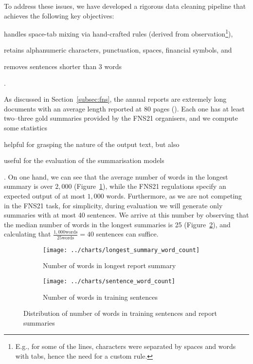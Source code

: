 To address these issues, we have developed a rigorous data cleaning pipeline that achieves the following key objectives:
\begin{enumerate*}
    \item handles space-tab mixing via hand-crafted rules (derived from observation\footnote{
      E.g., for some of the lines, characters were separated by spaces and words with tabs, hence the need for a custom rule.
    }),
    \item retains alphanumeric characters, punctuation, spaces, financial symbols, and
    \item removes sentences shorter than 3 words
\end{enumerate*}.

As discussed in Section~\ref{subsec:fns}, the annual reports are extremely long documents with an average length reported at 80 pages (\cite{litvak-vanetik-2021-summarization}).
Each one has at least two--three gold summaries provided by the FNS21 organisers, and we compute some statistics
\begin{enumerate*}
    \item helpful for grasping the nature of the output text, but also
    \item useful for the evaluation of the summarisation models
\end{enumerate*}.
On one hand, we can see that the average number of words in the longest summary is over $2,000$ (Figure~\ref{fig:longest_summary_word_count}), while the FNS21 regulations specify an expected output of at most $1,000$ words.
Furthermore, as we are not competing in the FNS21 task, for simplicity, during evaluation we will generate only summaries with at most 40 sentences.
We arrive at this number by observing that the median number of words in the longest summaries is 25 (Figure~\ref{fig:sentence_word_count}), and calculating that $\frac{1,000\text{words}}{25\text{words}}=40$ sentences can suffice.

\begin{figure}[ht]
    \begin{subfigure}{0.49\textwidth}
        \centering        \texttt{[image: ../charts/longest\_summary\_word\_count]}
        \caption{Number of words in longest report summary}
        \label{fig:longest_summary_word_count}
    \end{subfigure}%
    \hfill
    \begin{subfigure}{0.49\textwidth}
        \centering
        \texttt{[image: ../charts/sentence\_word\_count]}
        \caption{Number of words in training sentences}
        \label{fig:sentence_word_count}
    \end{subfigure}
    \caption{Distribution of number of words in training sentences and report summaries}
    \label{fig:word_count}
\end{figure}

